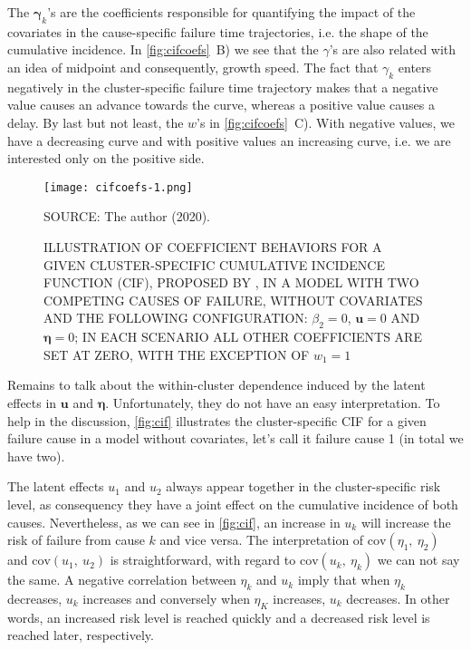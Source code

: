 The \(\bm{\gamma}_{k}\)'s are the coefficients responsible for
quantifying the impact of the covariates in the cause-specific failure
time trajectories, i.e. the shape of the cumulative incidence. In
\autoref{fig:cifcoefs}~B) we see that the \(\gamma\)'s are also related
with an idea of midpoint and consequently, growth speed. The fact that
\(\gamma_{k}\) enters negatively in the cluster-specific failure time
trajectory makes that a negative value causes an advance towards the
curve, whereas a positive value causes a delay. By last but not least,
the \(w\)'s in \autoref{fig:cifcoefs}~C). With negative values, we have
a decreasing curve and with positive values an increasing curve, i.e. we
are interested only on the positive side.

\begin{figure}[H]
  \setlength{\abovecaptionskip}{.0001pt}
  \caption{ILLUSTRATION OF COEFFICIENT BEHAVIORS FOR A GIVEN
    CLUSTER-SPECIFIC CUMULATIVE INCIDENCE FUNCTION (CIF), PROPOSED BY
    , IN A MODEL WITH TWO COMPETING CAUSES OF
    FAILURE, WITHOUT COVARIATES AND THE FOLLOWING CONFIGURATION:
    \(\beta_{2} = 0\), \(\bm{u} = 0\) AND \(\bm{\eta} = 0\); IN EACH
    SCENARIO ALL OTHER COEFFICIENTS ARE SET AT ZERO, WITH THE EXCEPTION
    OF \(w_{1} = 1\)}
  \vspace{0.3cm} \centering
  \texttt{[image: cifcoefs-1.png]}
  \\
  \vspace{0.1cm}
  \begin{footnotesize}
    SOURCE: The author (2020).
  \end{footnotesize}
  \label{fig:cifcoefs}
\end{figure}

Remains to talk about the within-cluster dependence induced by the
latent effects in \(\bm{u}\) and \(\bm{\eta}\). Unfortunately, they do
not have an easy interpretation. To help in the discussion,
\autoref{fig:cif} illustrates the cluster-specific CIF for a given
failure cause in a model without covariates, let's call it failure cause
1 (in total we have two).

The latent effects \(u_{1}\) and \(u_{2}\) always appear together in the
cluster-specific risk level, as consequency they have a joint effect on
the cumulative incidence of both causes. Nevertheless, as we can see in
\autoref{fig:cif}, an increase in \(u_{k}\) will increase the risk of
failure from cause \(k\) and vice versa. The interpretation of
\(\text{cov}(\eta_{1},~\eta_{2})\) and \(\text{cov}(u_{1},~u_{2})\) is
straightforward, with regard to \(\text{cov}(u_{k},~\eta_{k})\) we can
not say the same. A negative correlation between \(\eta_{k}\) and
\(u_{k}\) imply that when \(\eta_{k}\) decreases, \(u_{k}\) increases
and conversely when \(\eta_{K}\) increases, \(u_{k}\) decreases. In
other words, an increased risk level is reached quickly and a decreased
risk level is reached later, respectively.

